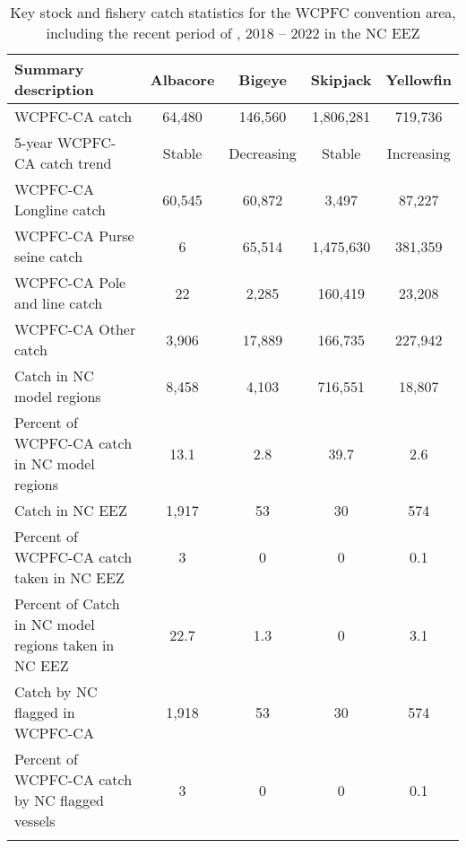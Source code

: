 \begin{longtable}{lcccc}
\caption{Key stock and fishery catch statistics for the WCPFC convention area, including the recent period of , 2018 -- 2022 in the NC EEZ} \\ 
  \hline
Summary description & Albacore & Bigeye & Skipjack & Yellowfin \\ 
  \hline
WCPFC-CA catch & 64,480 & 146,560 & 1,806,281 & 719,736 \\ 
  5-year WCPFC-CA catch trend & Stable & Decreasing & Stable & Increasing \\ 
  WCPFC-CA Longline catch & 60,545 & 60,872 & 3,497 & 87,227 \\ 
  WCPFC-CA Purse seine catch & 6 & 65,514 & 1,475,630 & 381,359 \\ 
  WCPFC-CA Pole and line catch & 22 & 2,285 & 160,419 & 23,208 \\ 
  WCPFC-CA Other catch & 3,906 & 17,889 & 166,735 & 227,942 \\ 
  Catch in NC model regions & 8,458 & 4,103 & 716,551 & 18,807 \\ 
  Percent of WCPFC-CA catch in NC model regions & 13.1 & 2.8 & 39.7 & 2.6 \\ 
   \hline
Catch in NC EEZ & 1,917 & 53 & 30 & 574 \\ 
  Percent of WCPFC-CA catch taken in NC EEZ & 3 & 0 & 0 & 0.1 \\ 
  Percent of Catch in NC model regions taken in NC EEZ & 22.7 & 1.3 & 0 & 3.1 \\ 
  Catch by NC flagged in WCPFC-CA & 1,918 & 53 & 30 & 574 \\ 
  Percent of WCPFC-CA catch by NC flagged vessels & 3 & 0 & 0 & 0.1 \\ 
  \hline
\label{cat_sum_tab}
\end{longtable}
